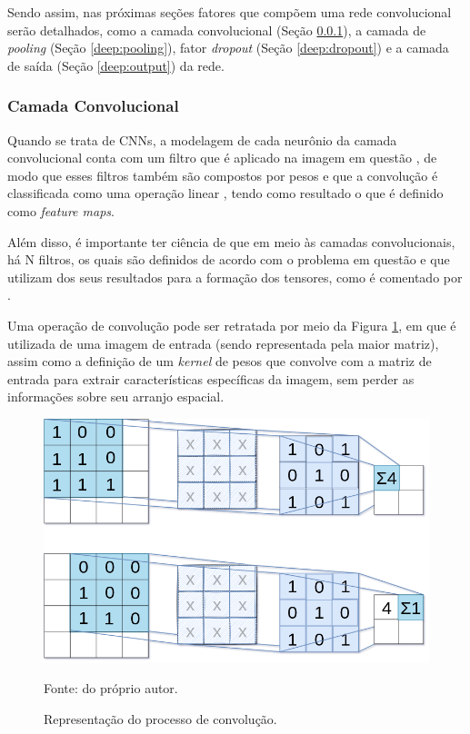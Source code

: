 Sendo assim, nas próximas seções fatores que compõem uma rede convolucional serão detalhados, como a camada convolucional (Seção \ref{deep:conv}), a camada de \textit{pooling} (Seção \ref{deep:pooling}), fator \textit{dropout} (Seção \ref{deep:dropout}) e a camada de saída (Seção \ref{deep:output}) da rede.


\subsubsection{Camada Convolucional}
\label{deep:conv}

Quando se trata de CNNs, a modelagem de cada neurônio da camada convolucional conta com um filtro que é aplicado na imagem em questão \cite{ponti2018funciona}, de modo que esses filtros também são compostos por pesos e que a convolução é classificada como uma operação linear \cite{Goodfellow2016}, tendo como resultado o que é definido como \textit{feature maps}.

Além disso, é importante ter ciência de que em meio às camadas convolucionais, há N filtros, os quais são definidos de acordo com o problema em questão e que utilizam dos seus resultados para a formação dos tensores, como é comentado por \cite{ponti2018funciona}.

Uma operação de convolução pode ser retratada por meio da Figura \ref{deep:fig:6}, em que é  utilizada de uma imagem de entrada (sendo representada pela maior matriz), assim como a definição de um \textit{kernel} de pesos que convolve com a matriz de entrada para extrair características específicas da imagem, sem perder as informações sobre seu arranjo espacial.

\begin{figure}[H]
    \centering
    \caption{Representação do processo de convolução.}
    \includegraphics[width=1\linewidth]{recursos/imagens/deep/2d_convolution.png}
    \label{deep:fig:6}
    
    \vspace*{1 cm}
    Fonte: do próprio autor.
\end{figure}

